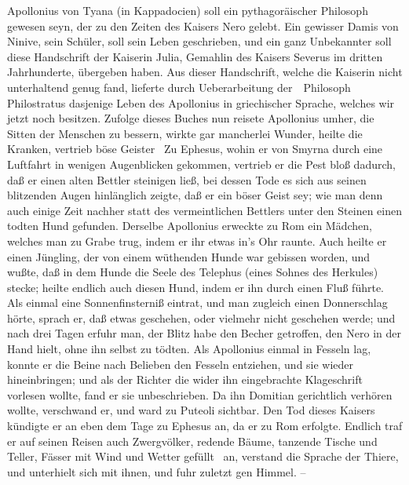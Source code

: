 \begin{aufza}
\item Apollonius von Tyana (in Kappadocien) soll ein pythagoräischer Philosoph gewesen seyn, der zu den Zeiten des Kaisers Nero gelebt. Ein gewisser Damis von Ninive, sein Schüler, soll sein Leben geschrieben, und ein ganz Unbekannter soll diese Handschrift der Kaiserin Julia, Gemahlin des Kaisers Severus im dritten Jahrhunderte, übergeben haben. Aus dieser Handschrift, welche die Kaiserin nicht unterhaltend genug fand, lieferte durch Ueberarbeitung der~\ Philosoph Philostratus dasjenige Leben des Apollonius in griechischer Sprache, welches wir jetzt noch besitzen. Zufolge dieses Buches nun reisete Apollonius umher, die Sitten der Menschen zu bessern, wirkte gar mancherlei Wunder, heilte die Kranken, vertrieb böse Geister \udgl\  Zu Ephesus, wohin er von Smyrna durch eine Luftfahrt in wenigen Augenblicken gekommen, vertrieb er die Pest bloß dadurch, daß er einen alten Bettler steinigen ließ, bei dessen Tode es sich aus seinen blitzenden Augen hinlänglich zeigte, daß er ein böser Geist sey; wie man denn auch einige Zeit nachher statt des vermeintlichen Bettlers unter den Steinen einen todten Hund gefunden. Derselbe Apollonius erweckte zu Rom ein Mädchen, welches man zu Grabe trug, indem er ihr etwas in's Ohr raunte. Auch heilte er einen Jüngling, der von einem wüthenden Hunde war gebissen worden, und wußte, daß in dem Hunde die Seele des Telephus (eines Sohnes des Herkules) stecke; heilte endlich auch diesen Hund, indem er ihn durch einen Fluß führte. Als einmal eine Sonnenfinsterniß eintrat, und man zugleich einen Donnerschlag hörte, sprach er, daß etwas geschehen, oder vielmehr nicht geschehen werde; und nach drei Tagen erfuhr man, der Blitz habe den Becher getroffen, den Nero in der Hand hielt, ohne ihn selbst zu tödten. Als Apollonius einmal in Fesseln lag, konnte er die Beine nach Belieben den Fesseln entziehen, und sie wieder hineinbringen; und als der Richter die wider ihn eingebrachte Klageschrift vorlesen wollte, fand er sie unbeschrieben. Da ihn Domitian gerichtlich verhören wollte, verschwand er, und ward zu Puteoli sichtbar. Den Tod dieses Kaisers kündigte er an eben dem Tage zu Ephesus an, da er zu Rom erfolgte. Endlich traf er auf seinen Reisen auch Zwergvölker, redende Bäume, tanzende Tische und Teller, Fässer mit Wind und Wetter gefüllt \udgl\  an, verstand die Sprache der Thiere, und unterhielt sich mit ihnen, und fuhr zuletzt gen Himmel. --

\end{aufza}
